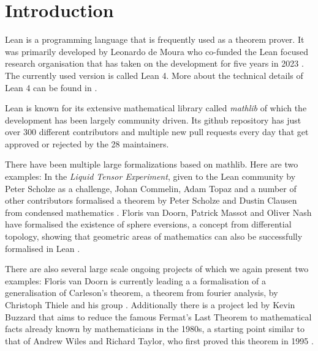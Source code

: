 \chapter*{Introduction}

Lean is a programming language that is frequently used as a theorem prover. 
It was primarily developed by Leonardo de Moura who co-funded the Lean focused research organisation that has taken on the development for five years in 2023 \cite{LeanFRO2024}. 
The currently used version is called Lean 4.
More about the technical details of Lean 4 can be found in \cite{deMoura2021}.

Lean is known for its extensive mathematical library called \emph{mathlib} of which the development has been largely community driven. 
Its github repository has just over 300 different contributors and multiple new pull requests every day that get approved or rejected by the 28 maintainers. 

There have been multiple large formalizations based on mathlib. 
Here are two examples: 
In the \emph{Liquid Tensor Experiment}, given to the Lean community by Peter Scholze as a challenge, Johan Commelin, Adam Topaz and a number of other contributors formalised a theorem by Peter Scholze and Dustin Clausen from condensed mathematics \cite{Commelin2022}.
Floris van Doorn, Patrick Massot and Oliver Nash have formalised the existence of sphere eversions, a concept from differential topology, showing that geometric areas of mathematics can also be successfully formalised in Lean \cite{vanDoorn2023}. 

There are also several large scale ongoing projects of which we again present two examples: 
Floris van Doorn is currently leading a a formalisation of a generalisation of Carleson's theorem, a theorem from fourier analysis, by Christoph Thiele and his group \cite{Becker2024}.
Additionally there is a project led by Kevin Buzzard that aims to reduce the famous Fermat's Last Theorem to mathematical facts already known by mathematicians in the 1980s, a starting point similar to that of Andrew Wiles and Richard Taylor, who first proved this theorem in 1995 \cite{Buzzard2024}.

